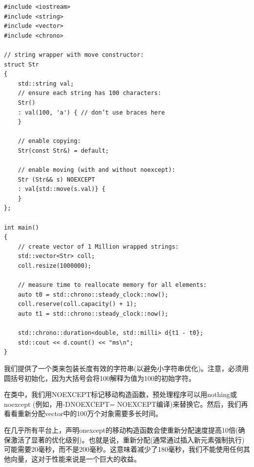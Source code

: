 \begin{lstlisting}[caption={}]
#include <iostream>
#include <string>
#include <vector>
#include <chrono>

// string wrapper with move constructor:
struct Str
{
	std::string val;
	// ensure each string has 100 characters:
	Str()
	: val(100, 'a') { // don’t use braces here
	}

	// enable copying:
	Str(const Str&) = default;
	
	// enable moving (with and without noexcept):
	Str (Str&& s) NOEXCEPT
	: val{std::move(s.val)} {
	}
};

int main()
{
	// create vector of 1 Million wrapped strings:
	std::vector<Str> coll;
	coll.resize(1000000);
	
	// measure time to reallocate memory for all elements:
	auto t0 = std::chrono::steady_clock::now();
	coll.reserve(coll.capacity() + 1);
	auto t1 = std::chrono::steady_clock::now();
	
	std::chrono::duration<double, std::milli> d{t1 - t0};
	std::cout << d.count() << "ms\n";
}
\end{lstlisting}

我们提供了一个类来包装长度有效的字符串(以避免小字符串优化)。注意，必须用圆括号初始化，因为大括号会将100解释为值为100的初始字符。\par

在类中，我们用NOEXCEPT标记移动构造函数，预处理程序可以用nothing或noexcept (例如，用-DNOEXCEPT= NOEXCEPT编译)来替换它。然后，我们再看看重新分配vector中的100万个对象需要多长时间。\par

在几乎所有平台上，声明onexcept的移动构造函数会使重新分配速度提高10倍(确保激活了显著的优化级别)。也就是说，重新分配(通常通过插入新元素强制执行)可能需要20毫秒，而不是200毫秒。这意味着减少了180毫秒，我们不能使用任何其他向量，这对于性能来说是一个巨大的收益。\par





